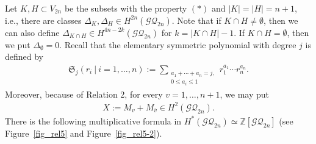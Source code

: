 \documentclass[12pt]{amsart}
\theoremstyle{remark}
\numberwithin{equation}{section}
\begin{document}
Let $K, H\subset V_{2n}$ be the subsets with the property $(\ast)$ and $|K|=|H|=n+1$,
i.e., there are classes $\Delta_{K}, \Delta_{H}\in H^{2n}(\mathcal{GQ}_{2n})$.
Note that if $K\cap H\not=\emptyset$, then we can also define $\Delta_{K\cap H}\in H^{4n-2k}(\mathcal{GQ}_{2n})$ for $k=|K\cap H|-1$.
If $K\cap H=\emptyset$, then we put $\Delta_{\emptyset}=0$.
Recall that the elementary symmetric polynomial with degree $j$ is defined by
\begin{align*}
\mathfrak{S}_{j}(r_{i}\ |\ i=1,\ldots, n):=\sum_{\substack{a_{1}+\cdots+a_{n}=j, \\ 0\le a_{i}\le 1}}r_{1}^{a_{1}}\cdots r_{n}^{a_{n}}.
\end{align*}
Moreover, 
because of Relation 2,  for every $v=1,\ldots, n+1$,
we may put 
\begin{align*}
X:=M_{v}+M_{\overline{v}}\in H^{2}(\mathcal{GQ}_{2n}).
\end{align*}
There is the following multiplicative formula in $H^{*}(\mathcal{GQ}_{2n})\simeq \mathbb{Z}[\mathcal{GQ}_{2n}]$ (see Figure~\ref{fig_rel5} and Figure~\ref{fig_rel5-2}).
\end{document}
